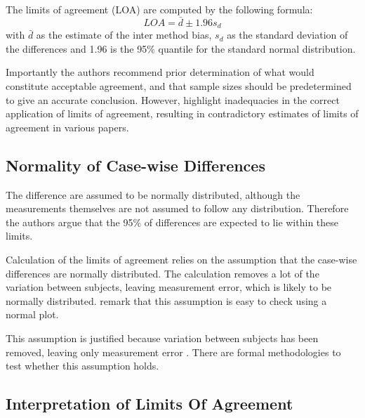 \documentclass[12pt, a4paper]{report}
\theoremstyle{plain}
\theoremstyle{definition}
\theoremstyle{remark}
\begin{document}
The limits of agreement (LOA) are computed by the following
formula:
\[
LOA = \bar{d} \pm 1.96 s_{d}
\]
with $\bar{d}$ as the estimate of the inter method bias, $s_{d}$
as the standard deviation of the differences and 1.96 is the 95\%
quantile for the standard normal distribution. 

Importantly the authors recommend prior determination of what would constitute acceptable agreement, and that sample sizes should be predetermined to give an accurate conclusion. However, \citet{mantha} highlight inadequacies in the correct application of limits of agreement, resulting in contradictory estimates of limits of agreement in various papers.








\subsection{Normality of Case-wise Differences}	
The difference are assumed to be normally distributed, although the measurements themselves are not assumed to follow any distribution. Therefore the authors argue that the 95\% of differences are expected to lie within these limits. 

Calculation of the limits of agreement relies on the assumption that the case-wise differences are normally distributed.
The calculation removes a lot of the variation between subjects,  leaving measurement error, which is likely to be normally distributed. \citet{BA99} remark that this assumption is easy to check using a normal plot. 


This assumption is justified because variation between subjects has been removed, leaving only measurement error \citep{BA86}. There are formal methodologies to test whether this assumption holds.






\subsection{Interpretation of Limits Of Agreement}
\end{document}
